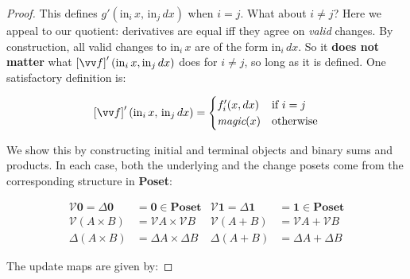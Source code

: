 \documentclass[nomarginums]{rntz}
\newcommand\todo[1]{{\color{Rhodamine}#1}}
\newcommand\cat\textbf
\newcommand\strong\textbf
\newcommand\Poset{\cat{Poset}}
\newcommand\initO{\ensuremath{\mathbold{0}}}
\newcommand\termO{\ensuremath{\mathbold{1}}}
\newcommand\D\Delta
\newcommand\x\times
\newcommand\triv{\star}
\newcommand\injc{\mathrm{in}}
\newcommand\inj[1]{\injc_{#1}\,}
\newcommand\fname[1]{\textit{#1}}
\newcommand\vals[1]{#1^v} %
\newcommand\chgs[1]{\D{#1}}
\newcommand\krof[1]{[{#1}]}
\newcommand\Krof[1]{\left[{#1}\right]}
\renewcommand\krof\Krof
\renewcommand\vals{\mathcal{V}}
\newcommand\deriv[1]{#1'}
\begin{document}
\begin{proof}
  This defines $g'(\inj i x,\, \inj j dx)$ when $i = j$. What about $i \ne j$?
  Here we appeal to our quotient: derivatives are equal iff they agree on
  \emph{valid} changes. By construction, all valid changes to $\inj i x$ are of
  the form $\inj i dx$. So it \strong{does not matter} what $\deriv{\krof{\vv
      f}}(\inj i x, \inj j dx)$ does for $i \ne j$, so long as it is defined.
  One satisfactory definition is:

  \begin{equation*}
    \deriv{\Krof{\vv f}}(\inj i x,\, \inj j dx) = 
    \begin{cases}
      \deriv f_i(x,dx) & \text{if}~ i=j\\
      \fname{magic}(x) & \text{otherwise}
    \end{cases}
  \end{equation*}

  \noindent\todo{TODO}

  \pagebreak
  We show this by constructing initial and terminal objects and binary sums and
  products. In each case, both the underlying and the change posets come from
  the corresponding structure in \Poset{}:


  \begin{align*}
    \vals \initO = \chgs \initO &= \initO \in \Poset &
    \vals \termO = \chgs \termO &= \termO \in \Poset \\
    \vals{(A \x B)} &= \vals A \x \vals B &
    \vals{(A + B)} &= \vals A + \vals B \\
    \chgs{(A \x B)} &= \chgs A \x \chgs B &
    \chgs{(A + B)} &= \chgs A + \chgs B
  \end{align*}

  \noindent The update maps are given by:


\end{proof}
\end{document}
